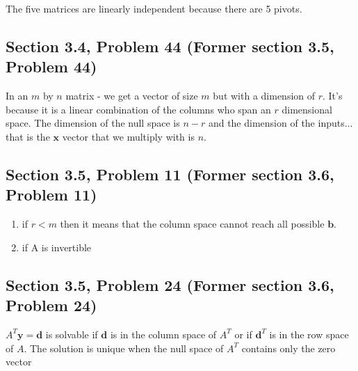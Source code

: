 \documentclass[a4paper,11pt]{article}
\newcommand{\mybf}[1]{\boldsymbol{#1}}
\begin{document}
The five matrices are linearly independent because there are 5 pivots.
\subsection*{Section 3.4, Problem 44  (Former section 3.5, Problem 44)}
In an $m$ by $n$ matrix - we get a vector of size $m$ but with a dimension of $r$. It's because it is a linear combination of the columns who span an $r$ dimensional space. The dimension of the null space is $n-r$ and the dimension of the inputs... that is the $\mybf{x}$ vector that we multiply with is $n$.
\subsection*{Section 3.5, Problem 11  (Former section 3.6, Problem 11)}
\begin{enumerate}[label=\alph*]
\item if $r<m$ then it means that the column space cannot reach all possible $\mybf{b}$.
\item if A is invertible
\end{enumerate}
\subsection*{Section 3.5, Problem 24  (Former section 3.6, Problem 24)}
$A^T\mybf{y}=\mybf{d}$ is solvable if $\mybf{d}$ is in the column space of $A^T$ or if $\mybf{d}^T$ is in the row space of $A$. The solution is unique when the null space of $A^T$ contains only the zero vector
\end{document}
